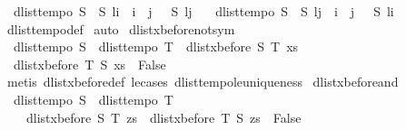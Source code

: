 \begin{isabellebody}
\ \ {\isachardoublequoteopen}dlist{\isacharunderscore}tempo{}\ S\ {\isasymLongrightarrow}\ S\ {\isacharparenleft}l{\isasymdagger}{\isachardot}{\isachardot}i{\isacharparenright}\ {\isasymLongrightarrow}\ i\ {\isasymle}\ j\ {\isasymLongrightarrow}\ {\isasymnot}\ S\ {\isacharparenleft}l{\isasymdagger}j{\isachardot}{\isachardot}{\isacharparenright}{\isachardoublequoteclose}\ \isanewline
\ \ {\isachardoublequoteopen}dlist{\isacharunderscore}tempo{}\ S\ {\isasymLongrightarrow}\ S\ {\isacharparenleft}l{\isasymdagger}j{\isachardot}{\isachardot}{\isacharparenright}\ {\isasymLongrightarrow}\ i\ {\isasymle}\ j\ {\isasymLongrightarrow}\ {\isasymnot}\ S\ {\isacharparenleft}l{\isasymdagger}{\isachardot}{\isachardot}i{\isacharparenright}{\isachardoublequoteclose}\isanewline
%
\isadelimproof
%
\endisadelimproof
%
\isatagproof
{}\isamarkupfalse%
\ dlist{\isacharunderscore}tempo{}{\isacharunderscore}def\isanewline
{}\isamarkupfalse%
\ auto%
\endisatagproof
{\isafoldproof}%
%
\isadelimproof
\isanewline
%
\endisadelimproof
\isanewline
{}\isamarkupfalse%
\ dlist{\isacharunderscore}xbefore{\isacharunderscore}not{\isacharunderscore}sym{\isacharcolon}\ \isanewline
\ \ {\isachardoublequoteopen}dlist{\isacharunderscore}tempo{}\ S\ {\isasymLongrightarrow}\ dlist{\isacharunderscore}tempo{}\ T\ {\isasymLongrightarrow}\ dlist{\isacharunderscore}xbefore\ S\ T\ xs\ {\isasymLongrightarrow}\ \isanewline
\ \ dlist{\isacharunderscore}xbefore\ T\ S\ xs\ {\isasymLongrightarrow}\ False{\isachardoublequoteclose}\isanewline
%
\isadelimproof
%
\endisadelimproof
%
\isatagproof
{}\isamarkupfalse%
\ {\isacharparenleft}metis\ dlist{\isacharunderscore}xbefore{\isacharunderscore}def\ le{\isacharunderscore}cases\ dlist{\isacharunderscore}tempo{}{\isacharunderscore}le{\isacharunderscore}uniqueness{\isacharparenright}%
\endisatagproof
{\isafoldproof}%
%
\isadelimproof
\isanewline
%
\endisadelimproof
\isanewline
{}\isamarkupfalse%
\ dlist{\isacharunderscore}xbefore{\isacharunderscore}and{\isacharcolon}\ \isanewline
\ \ {\isachardoublequoteopen}dlist{\isacharunderscore}tempo{}\ S\ {\isasymLongrightarrow}\ dlist{\isacharunderscore}tempo{}\ T\ {\isasymLongrightarrow}\ \isanewline
\ \ \ \ {\isacharparenleft}{\isacharparenleft}dlist{\isacharunderscore}xbefore\ S\ T\ zs{\isacharparenright}\ {\isasymand}\ {\isacharparenleft}dlist{\isacharunderscore}xbefore\ T\ S\ zs{\isacharparenright}{\isacharparenright}\ {\isacharequal}\ False{\isachardoublequoteclose}\isanewline

\end{isabellebody}
